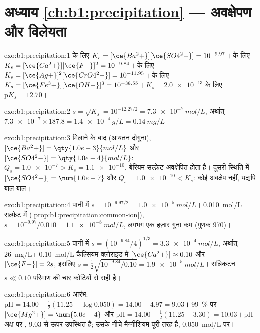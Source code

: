 \section*{अध्याय \ref{ch:b1:precipitation} --- अवक्षेपण और विलेयता}

\begin{solution}{exo:b1:precipitation:1}
 के लिए $K_s = [\ce{Ba^2+}][\ce{SO4^2-}] =
10^{-9.97}$।  के लिए $K_s = [\ce{Ca^2+}][\ce{F-}]^2 =
10^{-9.84}$।  के लिए $K_s =
[\ce{Ag+}]^2[\ce{CrO4^2-}] = 10^{-11.95}$।  के लिए
$K_s = [\ce{Fe^3+}][\ce{OH-}]^3 = 10^{-38.55}$। $K_s = \num{2.0e-13}$ के लिए
$\mathrm{p}K_s = 12.70$।
\end{solution}

\begin{solution}{exo:b1:precipitation:2}
$s = \sqrt{K_s} = 10^{-12.27/2} = \qty{7.3e-7}{mol/L}$, अर्थात्
$\num{7.3e-7} \times 187.8 = \qty{1.4e-4}{g/L} = \qty{0.14}{mg/L}$।
\end{solution}

\begin{solution}{exo:b1:precipitation:3}
मिलाने के बाद (आयतन दोगुना), $[\ce{Ba^2+}] = \qty{1.0e-3}{mol/L}$ और
$[\ce{SO4^2-}] = \qty{1.0e-4}{mol/L}$: $Q_s = \num{1.0e-7} > K_s =
\num{1.1e-10}$, बेरियम सल्फ़ेट अवक्षेपित होता है। दूसरी स्थिति में
$[\ce{SO4^2-}] = \num{1.0e-7}$ और $Q_s = \num{1.0e-10} < K_s$: कोई
अवक्षेप नहीं, यद्यपि बाल-बाल।
\end{solution}

\begin{solution}{exo:b1:precipitation:4}
पानी में $s = 10^{-9.97/2} = \qty{1.0e-5}{mol/L}$। \qty{0.010}{mol/L}
सल्फ़ेट में (\cref{prop:b1:precipitation:common-ion}), $s = 10^{-9.97}/0.010 =
\qty{1.1e-8}{mol/L}$, लगभग एक हज़ार गुना कम (गुणक 970)।
\end{solution}

\begin{solution}{exo:b1:precipitation:5}
पानी में $s = (10^{-9.84}/4)^{1/3} = \qty{3.3e-4}{mol/L}$, अर्थात्
\qty{26}{mg/L}। \qty{0.10}{mol/L} कैल्सियम क्लोराइड में
$[\ce{Ca^2+}] \approx 0.10$ और $[\ce{F-}] = 2s$, इसलिए
$s = \frac12\sqrt{10^{-9.84}/0.10} = \qty{1.9e-5}{mol/L}$।
सन्निकटन $s \ll 0.10$ परिमाण की चार कोटियों से सही है।
\end{solution}

\begin{solution}{exo:b1:precipitation:6}
आरंभ: $\mathrm{pH} = 14.00 - \frac12(11.25 + \log 0.050) = 14.00 - 4.97 =
9.03$। \qty{99}{\percent} पर $[\ce{Mg^2+}] = \num{5.0e-4}$ और
$\mathrm{pH} = 14.00 - \frac12(11.25 - 3.30) = 10.03$। pH अक्ष पर
, 9.03 से ऊपर उपस्थित है; उसके नीचे मैग्नीशियम पूरी तरह  है,
\qty{0.050}{mol/L} पर।
\end{solution}

